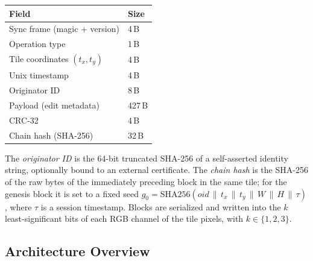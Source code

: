 \documentclass[conference]{IEEEtran}
\begin{document}
\smallskip
\begin{tabular}{@{}ll@{}}
  \toprule
  Field & Size \\
  \midrule
  Sync frame (magic + version)   & 4\,B \\
  Operation type                 & 1\,B \\
  Tile coordinates $(t_x, t_y)$  & 4\,B \\
  Unix timestamp                 & 4\,B \\
  Originator ID                  & 8\,B \\
  Payload (edit metadata)        & 427\,B \\
  CRC-32                         & 4\,B \\
  Chain hash (SHA-256)           & 32\,B \\
  \bottomrule
\end{tabular}
\smallskip

The \emph{originator ID} is the 64-bit truncated SHA-256 of a
self-asserted identity string, optionally bound to an external
certificate. The \emph{chain hash} is the SHA-256 of the raw bytes of
the immediately preceding block in the same tile; for the genesis block
it is set to a fixed seed $g_0 = \mathrm{SHA256}(\mathit{oid} \,\|\,
t_x \,\|\, t_y \,\|\, W \,\|\, H \,\|\, \tau)$,
where $\tau$ is a session timestamp. Blocks are serialized and written
into the $k$ least-significant bits of each RGB channel of the tile
pixels, with $k \in \{1, 2, 3\}$.

\subsection{Architecture Overview}
\end{document}
